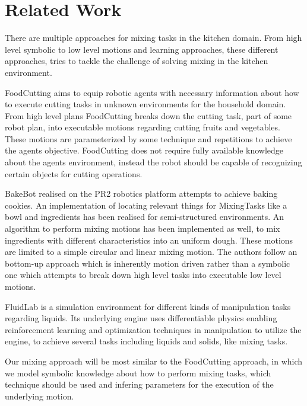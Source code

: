 \chapter*{Related Work}

There are multiple approaches for mixing tasks in the kitchen domain. From high level symbolic to low level motions and 
learning approaches, these different approaches, tries to tackle the challenge of solving mixing in the kitchen environment.

FoodCutting aims to equip robotic agents with necessary information about how to 
execute  cutting tasks in unknown environments for the household domain. From high level plans FoodCutting breaks down 
the cutting task, part of some robot plan, into executable motions regarding cutting fruits and vegetables. These motions are parameterized 
by some technique and repetitions to achieve the agents objective. 
FoodCutting does not require fully available knowledge
about the agents environment, instead the robot should be capable of recognizing certain objects for cutting 
operations. 

BakeBot realised on the PR2 robotics platform attempts to achieve baking cookies. An implementation of locating relevant things for MixingTasks
like a bowl and ingredients has been realised for semi-structured environments. An algorithm to perform mixing motions has been implemented as well, to mix 
ingredients with different characteristics into an uniform dough. These motions are limited to a simple circular and linear mixing motion.
The authors follow an bottom-up approach which is inherently motion driven rather than a
symbolic one which attempts to break down high level tasks into executable low level motions. 

FluidLab is a simulation environment for different kinds of manipulation tasks regarding liquids. Its underlying engine uses differentiable physics 
enabling reinforcement learning and optimization techniques in manipulation to utilize the engine, to achieve several tasks 
including liquids and solids, like mixing tasks. 

Our mixing approach will be most similar to the FoodCutting approach, in which we model symbolic knowledge about how to perform
mixing tasks, which technique should be used and infering parameters for the execution of the underlying motion.

